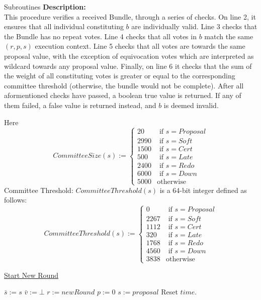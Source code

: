 \documentclass[10pt,a4paper]{article}
\begin{document}
\begin{section}{Subroutines}
\noindent \textbf{Description:}\\
This procedure verifies a received Bundle, through a series 
of checks.
On line 2, it ensures that all individual constituting $b$
are individually valid.
Line 3 checks that the Bundle has no repeat votes.
Line 4 checks that all votes in $b$ match the same $(r,p,s)$
execution context.
Line 5 checks that all votes are towards the same proposal value,
with the exception of equivocation votes which are interpreted as wildcard
towards any proposal value.
Finally, on line 6 it checks that the sum of the weight of all constituting
votes is greater or equal to the corresponding committee threshold (otherwise, 
the bundle would not be complete).
After all aformentioned checks have passed, a boolean true value is returned.
If any of them failed, a false value is returned instead, and $b$ is deemed invalid.

Here
$$
CommitteeSize(s):= \left\{
\begin{array}{rl}
     20 & \text{ if }s = Proposal \\
   2990 & \text{ if }s = Soft \\
   1500 & \text{ if }s = Cert \\
    500 & \text{ if }s = Late \\
   2400 & \text{ if }s = Redo \\
   6000 & \text{ if }s = Down \\
   5000 & \text{otherwise}
\end{array}
\right.
$$
Committee Threshold: $CommitteeThreshold(s)$ is a 64-bit integer defined as follows:
$$
CommitteeThreshold(s):= \left\{
\begin{array}{rl}
     0 &  \text{ if }s = Proposal \\
  2267 &  \text{ if }s = Soft \\
  1112 &  \text{ if }s = Cert \\
   320 &  \text{ if }s = Late \\
  1768 &  \text{ if }s = Redo \\
  4560 &  \text{ if }s = Down \\
  3838 &  \text{otherwise}
\end{array}
\right.
$$


\begin{algorithm}[H]\label{algo:start-new-round}
    \caption{\underline{Start New Round}}
    \label{algo:start-new-round}
    \begin{algorithmic}[1]
    \State $\bar{s} := s$
    \State $\bar{v} := \bot$
    \State $r := newRound$
    \State $p := 0$
    \State $s := proposal$
    \State Reset $time$.
    \EndFunction
    \end{algorithmic}
\end{algorithm}


\end{section}
\end{document}
